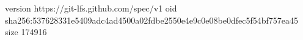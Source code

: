 version https://git-lfs.github.com/spec/v1
oid sha256:537628331e5409adc4ad4500a02fdbe2550e4e9c0e08be0dfec5f54bf757ea45
size 174916
